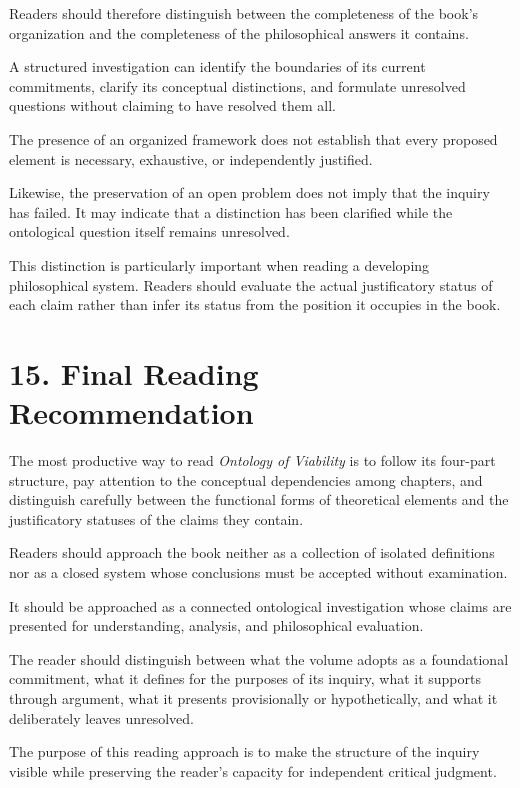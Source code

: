 Readers should therefore distinguish
between the completeness of the book's
organization and the completeness of
the philosophical answers it contains.

A structured investigation can identify
the boundaries of its current commitments,
clarify its conceptual distinctions,
and formulate unresolved questions
without claiming to have resolved them all.

The presence of an organized framework
does not establish that every proposed
element is necessary, exhaustive, or
independently justified.

Likewise, the preservation of an open
problem does not imply that the inquiry
has failed. It may indicate that a
distinction has been clarified while
the ontological question itself remains
unresolved.

This distinction is particularly important
when reading a developing philosophical
system. Readers should evaluate the
actual justificatory status of each claim
rather than infer its status from the
position it occupies in the book.


\section*{15. Final Reading Recommendation}

The most productive way to read
\textit{Ontology of Viability} is to
follow its four-part structure, pay
attention to the conceptual dependencies
among chapters, and distinguish carefully
between the functional forms of theoretical
elements and the justificatory statuses
of the claims they contain.

Readers should approach the book neither
as a collection of isolated definitions
nor as a closed system whose conclusions
must be accepted without examination.

It should be approached as a connected
ontological investigation whose claims
are presented for understanding, analysis,
and philosophical evaluation.

The reader should distinguish between
what the volume adopts as a foundational
commitment, what it defines for the
purposes of its inquiry, what it supports
through argument, what it presents
provisionally or hypothetically, and
what it deliberately leaves unresolved.

The purpose of this reading approach
is to make the structure of the inquiry
visible while preserving the reader's
capacity for independent critical judgment.

\cleardoublepage

